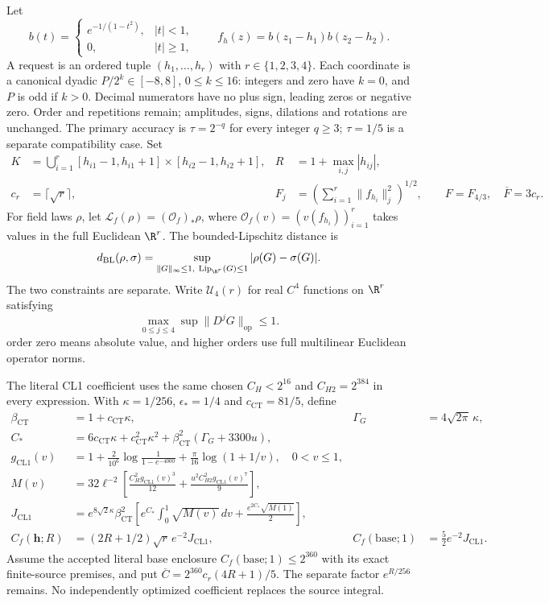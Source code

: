Let
\[
 b(t)=\begin{cases}e^{-1/(1-t^2)},&|t|<1,\\0,&|t|\ge1,\end{cases}
 \qquad f_h(z)=b(z_1-h_1)b(z_2-h_2).
\]
A request is an ordered tuple $(h_1,\ldots,h_r)$ with $r\in\{1,2,3,4\}$.
Each coordinate is a canonical dyadic $P/2^k\in[-8,8]$, $0\le k\le16$:
integers and zero have $k=0$, and $P$ is odd if $k>0$.
Decimal numerators have no plus sign, leading zeros or negative zero.
Order and repetitions remain; amplitudes, signs, dilations and rotations
are unchanged. The primary accuracy is $\tau=2^{-q}$ for every integer
$q\ge3$; $\tau=1/5$ is a separate compatibility case. Set
\begin{align*}
 K&=\bigcup_{i=1}^r[h_{i1}-1,h_{i1}+1]\times[h_{i2}-1,h_{i2}+1],&
 R&=1+\max_{i,j}|h_{ij}|,\\
 c_r&=\lceil\sqrt r\rceil,&
 F_j&=\left(\sum_{i=1}^r\|f_{h_i}\|_j^2\right)^{1/2},
 \qquad F=F_{4/3},\quad\overline F=3c_r.
\end{align*}
For field laws $\rho$, let $\mathcal L_f(\rho)=(\mathcal O_f)_*\rho$, where
$\mathcal O_f(v)=(v(f_{h_i}))_{i=1}^r$ takes values in the full Euclidean
$\R^r$. The bounded-Lipschitz distance is
\[
 d_{\mathrm{BL}}(\rho,\sigma)
 =\sup_{\|G\|_\infty\le1,\ \operatorname{Lip}_{\R^r}(G)\le1}
 |\rho(G)-\sigma(G)|.
\]
The two constraints are separate. Write $\mathcal U_4(r)$ for real $C^4$
functions on $\R^r$ satisfying
\[\max_{0\le j\le4}\sup\|D^jG\|_{\mathrm{op}}\le1.\]
order zero means absolute value, and higher orders use full multilinear
Euclidean operator norms.

The literal CL1 coefficient uses the same chosen $C_H<2^{16}$ and
$C_{H2}=2^{384}$ in every expression. With $\kappa=1/256$,
$\epsilon_*=1/4$ and $c_{\mathrm{CT}}=81/5$, define
\begin{align*}
 \beta_{\mathrm{CT}}&=1+c_{\mathrm{CT}}\kappa,
 &\Gamma_G&=4\sqrt{2\pi}\,\kappa,\\
 C_*&=6c_{\mathrm{CT}}\kappa+c_{\mathrm{CT}}^2\kappa^2
       +\beta_{\mathrm{CT}}^2(\Gamma_G+3300u),\\
 g_{\mathrm{CL1}}(v)&=1+\frac{2}{10^6}\log\frac1{1-e^{-4000}}
                  +\frac\pi{16}\log(1+1/v),\quad0<v\le1,\\
 M(v)&=32\ell^{-2}\left[\frac{C_H^2g_{\mathrm{CL1}}(v)^3}{12}
                     +\frac{u^2 C_{H2}^2g_{\mathrm{CL1}}(v)^7}{9}\right],\\
 J_{\mathrm{CL1}}&=e^{8\sqrt2\kappa}\beta_{\mathrm{CT}}^2
 \left[e^{C_*}\int_0^1\sqrt{M(v)}\,dv
            +\frac{e^{2C_*}\sqrt{M(1)}}2\right],\\
 C_f(\mathbf h;R)&=(2R+1/2)\sqrt r\,e^{-2}J_{\mathrm{CL1}},&
 C_f(\mathrm{base};1)&=\tfrac52 e^{-2}J_{\mathrm{CL1}}.
\end{align*}
Assume the accepted literal base enclosure $C_f(\mathrm{base};1)\le2^{360}$
with its exact finite-source premises, and put
$\overline C=2^{360}c_r(4R+1)/5$. The separate factor $e^{R/256}$ remains.
No independently optimized coefficient replaces the source integral.

